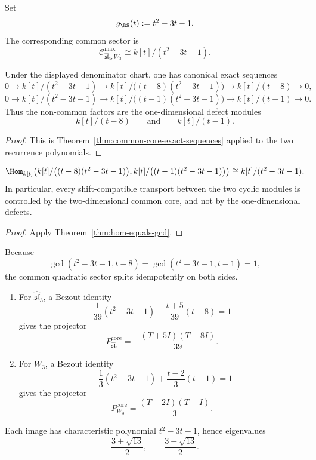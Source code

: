 \begin{definition}
Set
\[
g_{\DS}(t):=t^2-3t-1.
\]
The corresponding common sector is
\[
\mathcal C^{\max}_{\widehat{\mathfrak{sl}}_3,W_3}
\cong k[t]/(t^2-3t-1).
\]
\end{definition}

\begin{proposition}
\label{prop:sl3-w3-defect}
Under the displayed denominator chart, one has canonical exact sequences
\[
0\longrightarrow k[t]/(t^2-3t-1)\longrightarrow
k[t]/\bigl((t-8)(t^2-3t-1)\bigr)\longrightarrow k[t]/(t-8)\longrightarrow 0,
\]
\[
0\longrightarrow k[t]/(t^2-3t-1)\longrightarrow
k[t]/\bigl((t-1)(t^2-3t-1)\bigr)\longrightarrow k[t]/(t-1)\longrightarrow 0.
\]
Thus the non-common factors are the one-dimensional defect modules
\[
k[t]/(t-8)
\qquad\text{and}\qquad
k[t]/(t-1).
\]
\end{proposition}

\begin{proof}
This is Theorem~\ref{thm:common-core-exact-sequences} applied to the two recurrence polynomials.
\end{proof}

\begin{corollary}
\[
\Hom_{k[t]}\!\left(
k[t]/\bigl((t-8)(t^2-3t-1)\bigr),
k[t]/\bigl((t-1)(t^2-3t-1)\bigr)
\right)
\cong
k[t]/(t^2-3t-1).
\]
In particular, every shift-compatible transport between the two cyclic modules is controlled by the two-dimensional common core, and not by the one-dimensional defects.
\end{corollary}

\begin{proof}
Apply Theorem~\ref{thm:hom-equals-gcd}.
\end{proof}

\begin{proposition}
\label{prop:explicit-sl3-projectors}
Because
\[
\gcd(t^2-3t-1,t-8)=\gcd(t^2-3t-1,t-1)=1,
\]
the common quadratic sector splits idempotently on both sides.

\begin{enumerate}[label=\textup{(\roman*)}]
\item For \(\widehat{\mathfrak{sl}}_3\), a Bezout identity
\[
\frac1{39}(t^2-3t-1)-\frac{t+5}{39}(t-8)=1
\]
gives the projector
\[
P^{\mathrm{core}}_{\widehat{\mathfrak{sl}}_3}
=
-\frac{(T+5I)(T-8I)}{39}.
\]

\item For \(W_3\), a Bezout identity
\[
-\frac13(t^2-3t-1)+\frac{t-2}{3}(t-1)=1
\]
gives the projector
\[
P^{\mathrm{core}}_{W_3}
=
\frac{(T-2I)(T-I)}{3}.
\]
\end{enumerate}

Each image has characteristic polynomial \(t^2-3t-1\), hence eigenvalues
\[
\frac{3+\sqrt{13}}2,\qquad \frac{3-\sqrt{13}}2.
\]
\end{proposition}

